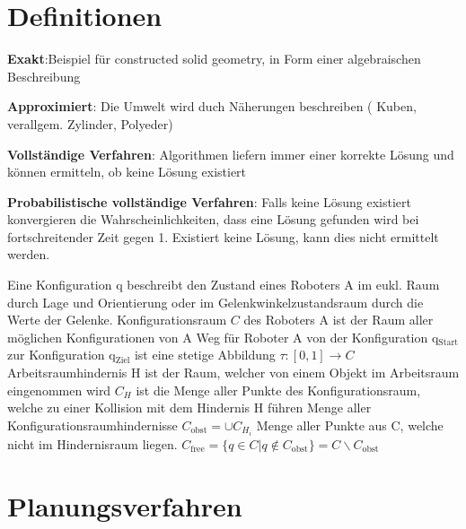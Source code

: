 \section{Definitionen}
\begin{compactitem}
    \item \textbf{Exakt}:Beispiel für constructed solid geometry, in Form einer
    algebraischen Beschreibung
    \item \textbf{Approximiert}: Die Umwelt wird duch Näherungen beschreiben (
    Kuben, verallgem. Zylinder, Polyeder)
\end{compactitem}

\begin{compactitem}
    \item \textbf{Vollständige Verfahren}: Algorithmen liefern immer einer korrekte
    Lösung und können ermitteln, ob keine Lösung existiert
    \item \textbf{Probabilistische vollständige Verfahren}: Falls keine Lösung
    existiert konvergieren die Wahrscheinlichkeiten, dass eine Lösung gefunden 
    wird bei fortschreitender Zeit gegen 1. Existiert keine Lösung, kann dies nicht
    ermittelt werden.
\end{compactitem}
Eine Konfiguration q beschreibt den Zustand eines Roboters A im eukl. Raum durch Lage und Orientierung
oder im Gelenkwinkelzustandsraum durch die Werte der Gelenke.
Konfigurationsraum $C$ des Roboters A ist der Raum aller möglichen Konfigurationen von A
Weg für Roboter A von der Konfiguration q$_\text{Start}$ zur Konfiguration q$_\text{Ziel}$ ist eine
stetige Abbildung $\tau:[0,1] \rightarrow C$
Arbeitsraumhindernis H ist der Raum, welcher von einem Objekt im Arbeitsraum eingenommen wird
$C_H$ ist die Menge aller Punkte des Konfigurationsraum, welche zu einer Kollision mit dem Hindernis
H führen
Menge aller Konfigurationsraumhindernisse $C_\text{obst} = \cup C_{H_i}$
Menge aller Punkte aus C, welche nicht im Hindernisraum liegen.
$C_\text{free} =  \{ q \in C | q \notin C_\text{obst}\} = C \backslash C_\text{obst}$

\section{Planungsverfahren}

